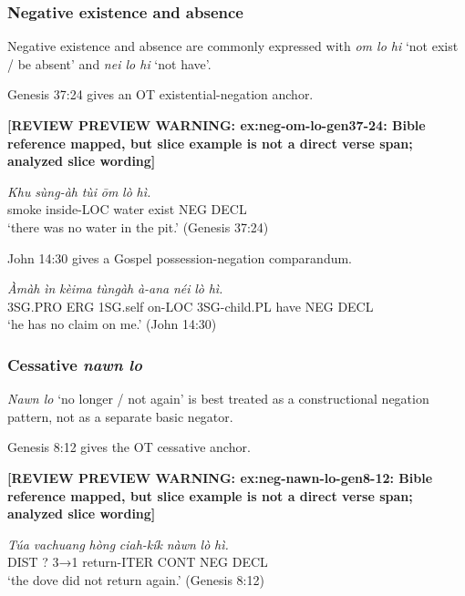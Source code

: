 \documentclass[
  11pt,
  a4paper,
]{article}
\newcommand{\tdim}[1]{\textit{#1}}
\newcommand{\tdimword}[1]{\textit{#1}}
\renewcommand{\textsc}[1]{{\footnotesize\MakeUppercase{#1}}}
\newcommand{\glossquote}[1]{`#1'}
\newcommand{\reviewwarninginline}[1]{\textbf{#1}\par\smallskip}
\begin{document}
\subsubsection{Negative existence and
absence}\label{negative-existence-and-absence}

Negative existence and absence are commonly expressed with
\tdim{om lo hi} \glossquote{not exist / be absent} and \tdim{nei lo hi}
\glossquote{not have}.

Genesis 37:24 gives an OT existential-negation anchor.

\begin{exe}
\ex \label{ex:neg-om-lo-gen37-24}
\reviewwarninginline{[REVIEW PREVIEW WARNING: ex:neg-om-lo-gen37-24: Bible reference mapped, but slice example is not a direct verse span; analyzed slice wording]}
\gll \tdimword{Khu} \tdimword{sùng-àh} \tdimword{tùi} \tdimword{ōm} \tdimword{lò} \tdimword{hì.} \\
     smoke inside-\textsc{loc} water exist \textsc{neg} \textsc{decl} \\
\glt \glossquote{there was no water in the pit.} (Genesis 37:24)
\end{exe}

John 14:30 gives a Gospel possession-negation comparandum.

\begin{exe}
\ex \label{ex:neg-nei-lo-john14-30}
\gll \tdimword{Àmàh} \tdimword{ìn} \tdimword{kèima} \tdimword{tùngàh} \tdimword{à-ana} \tdimword{néi} \tdimword{lò} \tdimword{hì.} \\
     \textsc{3sg}.\textsc{pro} \textsc{erg} \textsc{1sg}.self on-\textsc{loc} \textsc{3sg}-child.\textsc{pl} have \textsc{neg} \textsc{decl} \\
\glt \glossquote{he has no claim on me.} (John 14:30)
\end{exe}

\subsubsection{\texorpdfstring{Cessative
\tdim{nawn lo}}{Cessative }}\label{cessative}

\tdim{Nawn lo} \glossquote{no longer / not again} is best treated as a
constructional negation pattern, not as a separate basic negator.

Genesis 8:12 gives the OT cessative anchor.

\begin{exe}
\ex \label{ex:neg-nawn-lo-gen8-12}
\reviewwarninginline{[REVIEW PREVIEW WARNING: ex:neg-nawn-lo-gen8-12: Bible reference mapped, but slice example is not a direct verse span; analyzed slice wording]}
\gll \tdimword{Túa} \tdimword{vachuang} \tdimword{hòng} \tdimword{ciah-kík} \tdimword{nàwn} \tdimword{lò} \tdimword{hì.} \\
     \textsc{dist} ? \textsc{3→1} return-\textsc{iter} \textsc{cont} \textsc{neg} \textsc{decl} \\
\glt \glossquote{the dove did not return again.} (Genesis 8:12)
\end{exe}
\end{document}
